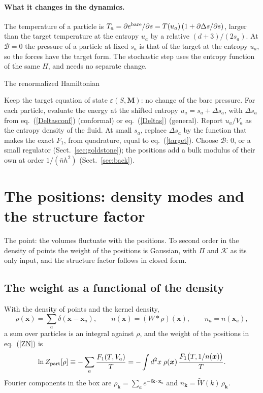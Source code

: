 \documentclass[11pt,aps,preprint,nofootinbib,superscriptaddress,tightenlines]{revtex4-2}
\newcommand{\klab}{\mathcal B}
\def\st{\begin{equation}}
\def\stp{\end{equation}}
\def\Eq#1{eq.~(\ref{#1})}
\def\Sect#1{Sect.~\ref{#1}}
\let\oldparagraph\paragraph
\renewcommand{\paragraph}{\par\bigskip\oldparagraph}
\begin{document}
\paragraph{What it changes in the dynamics.}  The temperature of a particle is $T_a=\partial e^{\rm bare}/\partial s=T(u_a)\,(1+\partial\Delta s/\partial s)$, larger than
the target temperature at the entropy $u_a$ by a relative $(d+3)/(2s_a)$.  At $\klab=0$ the pressure of a particle at fixed $s_a$ is that of the target at the entropy
$u_a$, so the forces have the target form.  The stochastic step uses the entropy function of the same $H$, and needs no separate change.

\begin{algobox}{The renormalized Hamiltonian}
\begin{algorithmic}[1]
\State Keep the target equation of state $\varepsilon(S,\bm M)$: no change of the bare pressure.
\State For each particle, evaluate the energy at the shifted entropy $u_a=s_a+\Delta s_a$, with $\Delta s_a$ from \Eq{Deltasconf} (conformal) or \Eq{Deltas} (general).
\State Report $u_a/V_a$ as the entropy density of the fluid.
\State At small $s_a$, replace $\Delta s_a$ by the function that makes the exact $F_1$, from quadrature, equal to \Eq{target}.
\State Choose $\klab$: $0$, or a small regulator (\Sect{sec:goldstone}); the positions add a bulk modulus of their own at order $1/(\bar nh^2)$ (\Sect{sec:back}).
\end{algorithmic}
\end{algobox}

\section{The positions: density modes and the structure factor}
\label{sec:modes}

The point: the volumes fluctuate with the positions.  To second order in the density of points the weight of the positions is Gaussian, with $\Pi$ and
$\mathcal K$ as its only input, and the structure factor follows in closed form.

\subsection{The weight as a functional of the density}
\label{sec:functional}

With the density of points and the kernel density,
\st
\rho(\bm x)=\sum_a\delta(\bm x-\bm x_a),\qquad n(\bm x)=(W*\rho)(\bm x),\qquad n_a=n(\bm x_a) ,
\stp
a sum over particles is an integral against $\rho$, and the weight of the positions in \Eq{ZN} is
\st
\ln Z_{\rm part}[\rho]\equiv-\sum_a\frac{F_1(T,V_a)}T=-\int d^2x\;\rho(\bm x)\,\frac{F_1\big(T,1/n(\bm x)\big)}T .
\stp
Fourier components in the box are $\rho_{\bm k}=\sum_ae^{-i\bm k\cdot\bm x_a}$ and $n_{\bm k}=\widetilde W(k)\,\rho_{\bm k}$.
\end{document}
